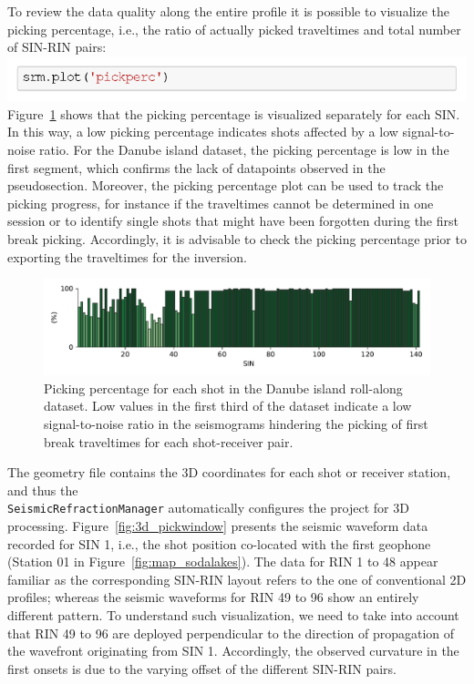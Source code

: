 \documentclass[a4paper,fleqn]{cas-sc}
\begin{document}
To review the data quality along the entire profile it is possible to visualize the picking percentage, i.e., the ratio of actually picked traveltimes and total number of SIN-RIN pairs:
\newline
\includegraphics[width=.5\textwidth]{./figures/plot_pickperc_danube.pdf}
\newline
Figure~\ref{fig:rollalong_pickperc} shows that the picking percentage is visualized separately for each SIN. In this way, a low picking percentage indicates shots affected by a low signal-to-noise ratio. For the Danube island dataset, the picking percentage is low in the first segment, which confirms the lack of datapoints observed in the pseudosection. Moreover, the picking percentage plot can be used to track the picking progress, for instance 
if the traveltimes cannot be determined in one session or 
to identify single shots that might have been forgotten during the first break picking. Accordingly, it is advisable to check the picking percentage prior to exporting the traveltimes for the inversion.

\begin{figure}
	\centering
	\includegraphics[width=.75\textwidth]{figures/rollalong_pickperc.pdf}
	\caption{Picking percentage for each shot in the Danube island roll-along dataset. Low values in the first third of the dataset indicate a low signal-to-noise ratio in the seismograms hindering the picking of first break traveltimes for each shot-receiver pair.}
	\label{fig:rollalong_pickperc}
\end{figure}

The geometry file contains the 3D coordinates for each shot or receiver station, and thus the\\ \texttt{SeismicRefractionManager} %
automatically configures the project for 3D processing. 
Figure~\ref{fig:3d_pickwindow} presents the seismic waveform data recorded for SIN 1, i.e., the shot position co-located with the first geophone (Station 01 in Figure~\ref{fig:map_sodalakes}). The data for RIN 1 to 48 appear familiar as the corresponding SIN-RIN layout refers to the one of conventional 2D profiles; whereas the seismic waveforms for RIN 49 to 96 show an entirely different pattern. To understand such visualization, we need to take into account that RIN 49 to 96 are deployed perpendicular to the direction of propagation of the wavefront originating from SIN 1. Accordingly, the observed curvature in the first onsets is due to the varying offset of the different SIN-RIN pairs.
\end{document}
